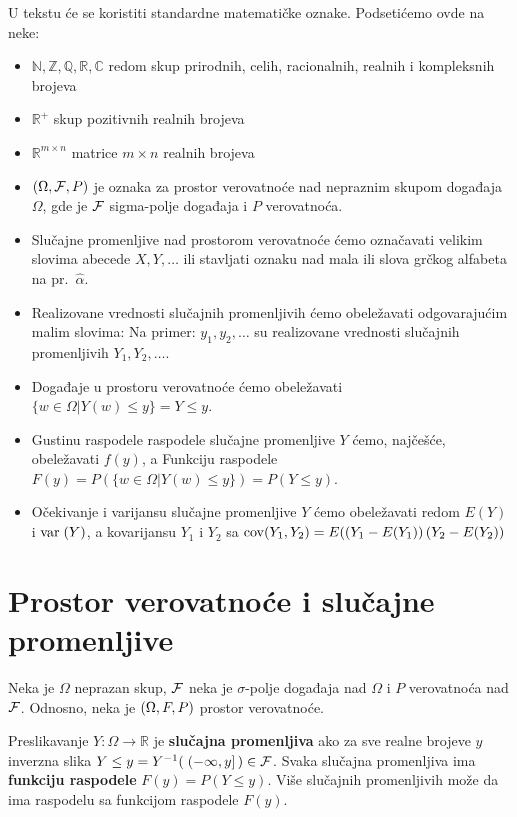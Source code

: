 \documentclass[twoside,titlepage,12pt,a4paper]{book}
\def\R{\mathbb{R}}
\def\Z{\mathbb{Z}}
\def\N{\mathbb{N}}
\def\C{\mathbb{C}}
\def\Q{\mathbb{Q}}
\def\var{\mathop{\rm var}\nolimits}
\def\cov{\mathop{\rm cov}\nolimits}
\numberwithin{equation}{chapter}
\begin{document}
U tekstu će se koristiti standardne matematičke oznake.
Podsetićemo ovde na neke:
\begin{itemize}
\item $\N, \Z, \Q, \R, \C$ redom skup prirodnih, celih, racionalnih, realnih i kompleksnih brojeva
\item $\R^+$ skup pozitivnih realnih brojeva
\item $\R^{m\times n}$ matrice ${m\times n}$ realnih brojeva
\item $( \Omega, {\cal F}, P )$ je oznaka za prostor verovatnoće
nad nepraznim skupom događaja $\Omega$, gde je ${\cal F}$
sigma-polje događaja i $P$ verovatnoća.
\item Slučajne promenljive nad prostorom verovatnoće ćemo
označavati velikim slovima abecede $X, Y, \ldots$ ili stavljati
oznaku nad mala ili slova grčkog alfabeta na pr.\ $\hat{\alpha}$.
\item Realizovane vrednosti slučajnih promenljivih ćemo obeležavati
odgovarajućim malim slovima: Na primer: $y_1, y_2, \ldots$ su
realizovane vrednosti slučajnih promenljivih  $Y_1, Y_2, \ldots$.
\item Događaje u prostoru verovatnoće ćemo obeležavati $\displaystyle \{ w \in \Omega | Y ( w ) \le y \} = Y \le y$.
\item Gustinu raspodele raspodele slučajne promenljive $Y$ ćemo, najčešće,
obeležavati $f ( y )$, a Funkciju raspodele $F ( y ) = P ( \{ w \in \Omega | Y ( w ) \le y \} ) = P ( Y \le y )$.
\item Očekivanje i varijansu slučajne promenljive $Y$ ćemo obeležavati redom $E ( Y )$
i $\var\; ( Y ) $, a kovarijansu $Y_1$ i $Y_2$ sa $\cov ( Y_1, Y_2 ) = E ( ( Y_1 - E ( Y_1 ) ) \,  ( Y_2 - E ( Y_2 ) )$
\end{itemize}


\section{Prostor verovatnoće i slučajne promenljive}

Neka je $\Omega$ neprazan skup, ${\cal F}$ neka je $\sigma$-polje događaja nad $\Omega$ i $P$ verovatnoća nad ${\cal F}$. Odnosno, neka je $( \Omega, {\cal} F, P )$ prostor verovatnoće.

Preslikavanje $Y : \Omega \rightarrow \R$ je \textbf{slučajna promenljiva} ako za sve realne brojeve $y$ inverzna slika $Y \le y = Y^{-1} ( \; ( -\infty, y ] \, ) \in {\cal F}$.
Svaka slučajna promenljiva ima \textbf{funkciju raspodele} $F ( y ) = P ( Y \le y )$. Više slučajnih promenljivih može da ima raspodelu sa funkcijom raspodele $F ( y )$.
\end{document}
